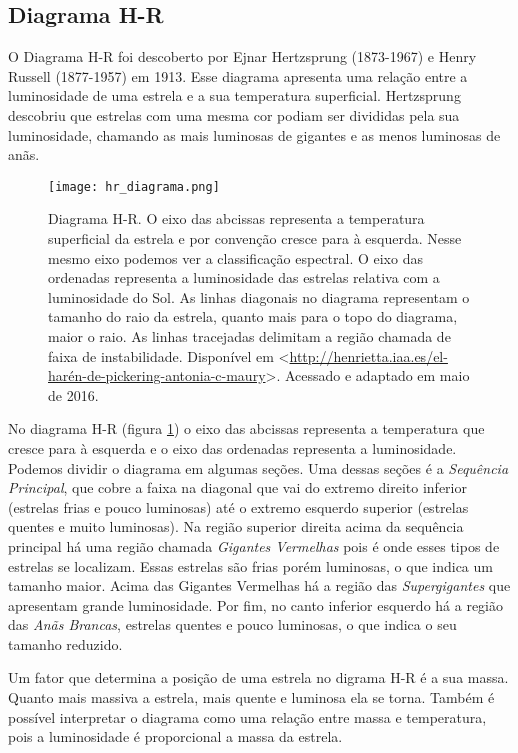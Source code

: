 \subsection{Diagrama H-R}

O Diagrama H-R foi descoberto por Ejnar Hertzsprung (1873-1967) e Henry Russell (1877-1957) em 1913. Esse diagrama apresenta uma relação entre a luminosidade de uma estrela e a sua temperatura superficial. Hertzsprung descobriu que estrelas com uma mesma cor podiam ser divididas pela sua luminosidade, chamando as mais luminosas de gigantes e as menos luminosas de anãs.

\begin{figure}[!ht]
\centering
\texttt{[image: hr\_diagrama.png]}
\caption[Diagrama H-R.]{Diagrama H-R. O eixo das abcissas representa a temperatura superficial da estrela e por convenção cresce para à esquerda. Nesse mesmo eixo podemos ver a classificação espectral. O eixo das ordenadas representa a luminosidade das estrelas relativa com a luminosidade do Sol. As linhas diagonais no diagrama representam o tamanho do raio da estrela, quanto mais para o topo do diagrama, maior o raio. As linhas tracejadas delimitam a região chamada de faixa de instabilidade. Disponível em <\url{http://henrietta.iaa.es/el-harén-de-pickering-antonia-c-maury}>. Acessado e adaptado em maio de 2016.}
\label{fig:diagrama_hr}
\end{figure}

No diagrama H-R (figura \ref{fig:diagrama_hr}) o eixo das abcissas representa a temperatura que cresce para à esquerda e o eixo das ordenadas representa a luminosidade. Podemos dividir o diagrama em algumas seções. Uma dessas seções é a \textit{Sequência Principal}, que cobre a faixa na diagonal que vai do extremo direito inferior (estrelas frias e pouco luminosas) até o extremo esquerdo superior (estrelas quentes e muito luminosas). Na região superior direita acima da sequência principal há uma região chamada \textit{Gigantes Vermelhas} pois é onde esses tipos de estrelas se localizam. Essas estrelas são frias porém luminosas, o que indica um tamanho maior. Acima das Gigantes Vermelhas há a região das \textit{Supergigantes} que apresentam grande luminosidade. Por fim, no canto inferior esquerdo há a região das \textit{Anãs Brancas}, estrelas quentes e pouco luminosas, o que indica o seu tamanho reduzido.

Um fator que determina a posição de uma estrela no digrama H-R é a sua massa. Quanto mais massiva a estrela, mais quente e luminosa ela se torna. Também é possível interpretar o diagrama como uma relação entre massa e temperatura, pois a luminosidade é proporcional a massa da estrela.

